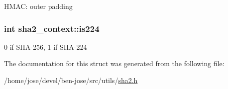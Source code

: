 H\+M\+A\+C\+: outer padding \hypertarget{structsha2__context_a20fd61f8c14d811e93b7186ca71ecfbd}{
\subsubsection[{is224}]{\setlength{\rightskip}{0pt plus 5cm}int sha2\+\_\+context\+::is224}}\label{structsha2__context_a20fd61f8c14d811e93b7186ca71ecfbd}
0 if S\+H\+A-\/256, 1 if S\+H\+A-\/224 

The documentation for this struct was generated from the following file\+:\begin{DoxyCompactItemize}
\item 
/home/jose/devel/ben-\/jose/src/utils/\hyperlink{sha2_8h}{sha2.\+h}\end{DoxyCompactItemize}
